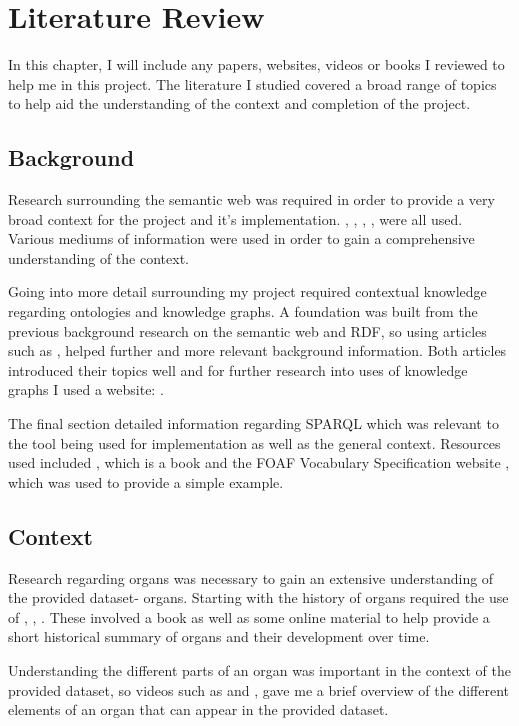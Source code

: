 \chapter{Literature Review}
In this chapter, I will include any papers, websites, videos or books I reviewed to help me in this project. The literature I studied covered a broad range of topics to help aid the understanding of the context and completion of the project.

\section{Background}
\hspace{0.5cm} Research surrounding the semantic web was required in order to provide a very broad context for the project and it's implementation. \cite{berners-TBLBook}, \cite{semanticweb}, \cite{wikidata}, \cite{rdf}, \cite{TTL} were all used. Various mediums of information were used in order to gain a comprehensive understanding of the context. 

Going into more detail surrounding my project required contextual knowledge regarding ontologies and knowledge graphs. A foundation was built from the previous background research on the semantic web and RDF, so using articles such as \cite{ontology}, \cite{knowledgegraph} helped further and more relevant background information. Both articles introduced their topics well and for further research into uses of knowledge graphs I used a website: \cite{searchengine}.   

The final section detailed information regarding SPARQL which was relevant to the tool being used for implementation as well as the general context. Resources used included \cite{sparlbook}, which is a book and the FOAF Vocabulary Specification website \cite{foaf}, which was used to provide a simple example. 

\section{Context}
\hspace{0.5cm} Research regarding organs was necessary to gain an extensive understanding of the provided dataset- organs. Starting with the history of organs required the use of \cite{organhistory}, \cite{organhistory1}, \cite{organmedivalhistory}. These involved a book as well as some online material to help provide a short historical summary of organs and their development over time. 

Understanding the different parts of an organ was important in the context of the provided dataset, so videos such as \cite{organvideo} and \cite{organvideo1}, gave me a brief overview of the different elements of an organ that can appear in the provided dataset. 

